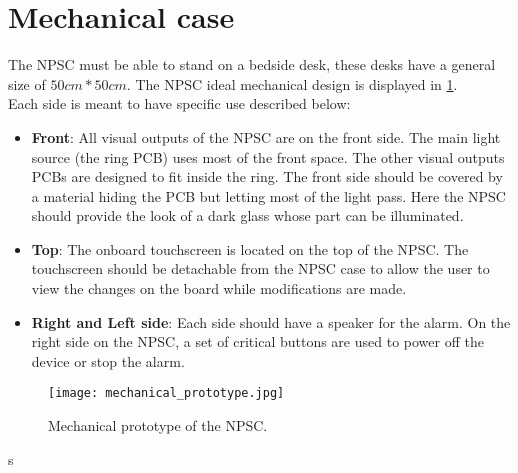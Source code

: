 \section{Mechanical case}
The NPSC must be able to stand on a bedside desk, these desks have a general size of $50cm*50cm$. The NPSC ideal mechanical design is displayed in \cref{fig:mechanical_prototype}.\\
Each side is meant to have specific use described below:
\begin{itemize}
\item \textbf{Front}: All visual outputs of the NPSC are on the front side. The main light source (the ring PCB) uses most of the front space. The other visual outputs PCBs are designed to fit inside the ring. The front side should be covered by a material hiding the PCB but letting most of the light pass. Here the NPSC should provide the look of a dark glass whose part can be illuminated.
\item \textbf{Top}: The onboard touchscreen is located on the top of the NPSC. The touchscreen should be detachable from the NPSC case to allow the user to view the changes on the board while modifications are made.
\item \textbf{Right and Left side}: Each side should have a speaker for the alarm. On the right side on the NPSC, a set of critical buttons are used to power off the device or stop the alarm.
\end{itemize} 
\begin{figure}[ht]
\centering
\texttt{[image: mechanical\_prototype.jpg]}
\caption{Mechanical prototype of the NPSC.}
\label{fig:mechanical_prototype}
\end{figure}s